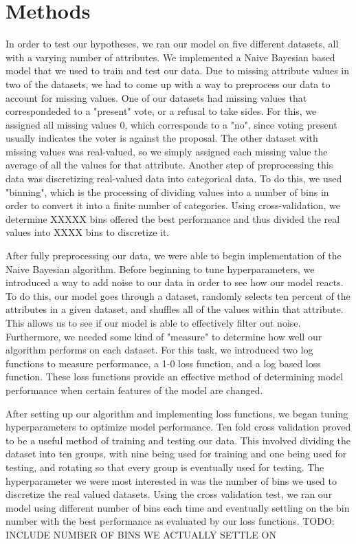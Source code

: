 \documentclass[twoside,11pt]{article}
\begin{document}
\section{Methods}
In order to test our hypotheses, we ran our model on five different datasets, all with a varying number of attributes. We implemented a Naive Bayesian based model that we used to train and test our data. Due to missing attribute values in two of the datasets, we had to come up with a way to preprocess our data to account for missing values. One of our datasets had missing values that correspondeded to a "present" vote, or a refusal to take sides. For this, we assigned all missing values 0, which corresponds to a "no", since voting present usually indicates the voter is against the proposal. The other dataset with missing values was real-valued, so we simply assigned each missing value the average of all the values for that attribute. Another step of preprocessing this data was discretizing real-valued data into categorical data. To do this, we used "binning", which is the processing of dividing values into a number of bins in order to convert it into a finite number of categories. Using cross-validation, we determine XXXXX bins offered the best performance and thus divided the real values into XXXX bins to discretize it. 

After fully preprocessing our data, we were able to begin implementation of the Naive Bayesian algorithm. Before beginning to tune hyperparameters, we introduced a way to add noise to our data in order to see how our model reacts. To do this, our model goes through a dataset, randomly selects ten percent of the attributes in a given dataset, and shuffles all of the values within that attribute. This allows us to see if our model is able to effectively filter out noise. Furthermore, we needed some kind of "measure" to determine how well our algorithm performs on each dataset. For this task, we introduced two log functions to measure performance, a 1-0 loss function, and a log based loss function. These loss functions provide an effective method of determining model performance when certain features of the model are changed.

After setting up our algorithm and implementing loss functions, we began tuning hyperparameters to optimize model performance. Ten fold cross validation proved to be a useful method of training and testing our data. This involved dividing the dataset into ten groups, with nine being used for training and one being used for testing, and rotating so that every group is eventually used for testing. The hyperparameter we were most interested in was the number of bins we used to discretize the real valued datasets. Using the cross validation test, we ran our model using different number of bins each time and eventually settling on the bin number with the best performance as evaluated by our loss functions. TODO: INCLUDE NUMBER OF BINS WE ACTUALLY SETTLE ON
\vskip 0.2in

\end{document}
